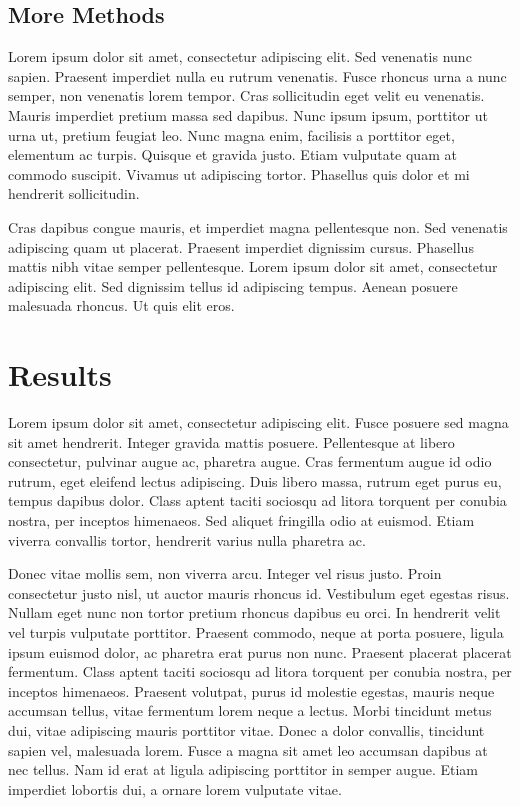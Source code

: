 \documentclass[double,12pt]{beavtex}
\begin{document}
\section{More Methods}

Lorem ipsum dolor sit amet, consectetur adipiscing elit. Sed venenatis nunc sapien. Praesent imperdiet nulla eu rutrum venenatis. Fusce rhoncus urna a nunc semper, non venenatis lorem tempor. Cras sollicitudin eget velit eu venenatis. Mauris imperdiet pretium massa sed dapibus. Nunc ipsum ipsum, porttitor ut urna ut, pretium feugiat leo. Nunc magna enim, facilisis a porttitor eget, elementum ac turpis. Quisque et gravida justo. Etiam vulputate quam at commodo suscipit. Vivamus ut adipiscing tortor. Phasellus quis dolor et mi hendrerit sollicitudin. 

Cras dapibus congue mauris, et imperdiet magna pellentesque non. Sed venenatis adipiscing quam ut placerat. Praesent imperdiet dignissim cursus. Phasellus mattis nibh vitae semper pellentesque. Lorem ipsum dolor sit amet, consectetur adipiscing elit. Sed dignissim tellus id adipiscing tempus. Aenean posuere malesuada rhoncus. Ut quis elit eros.



\chapter{Results}

Lorem ipsum dolor sit amet, consectetur adipiscing elit. Fusce posuere sed magna sit amet hendrerit. Integer gravida mattis posuere. Pellentesque at libero consectetur, pulvinar augue ac, pharetra augue. Cras fermentum augue id odio rutrum, eget eleifend lectus adipiscing. Duis libero massa, rutrum eget purus eu, tempus dapibus dolor. Class aptent taciti sociosqu ad litora torquent per conubia nostra, per inceptos himenaeos. Sed aliquet fringilla odio at euismod. Etiam viverra convallis tortor, hendrerit varius nulla pharetra ac. 

Donec vitae mollis sem, non viverra arcu. Integer vel risus justo. Proin consectetur justo nisl, ut auctor mauris rhoncus id. Vestibulum eget egestas risus. Nullam eget nunc non tortor pretium rhoncus dapibus eu orci. In hendrerit velit vel turpis vulputate porttitor. Praesent commodo, neque at porta posuere, ligula ipsum euismod dolor, ac pharetra erat purus non nunc. Praesent placerat placerat fermentum. Class aptent taciti sociosqu ad litora torquent per conubia nostra, per inceptos himenaeos. Praesent volutpat, purus id molestie egestas, mauris neque accumsan tellus, vitae fermentum lorem neque a lectus. Morbi tincidunt metus dui, vitae adipiscing mauris porttitor vitae. Donec a dolor convallis, tincidunt sapien vel, malesuada lorem. Fusce a magna sit amet leo accumsan dapibus at nec tellus. Nam id erat at ligula adipiscing porttitor in semper augue. Etiam imperdiet lobortis dui, a ornare lorem vulputate vitae. 
\end{document}

